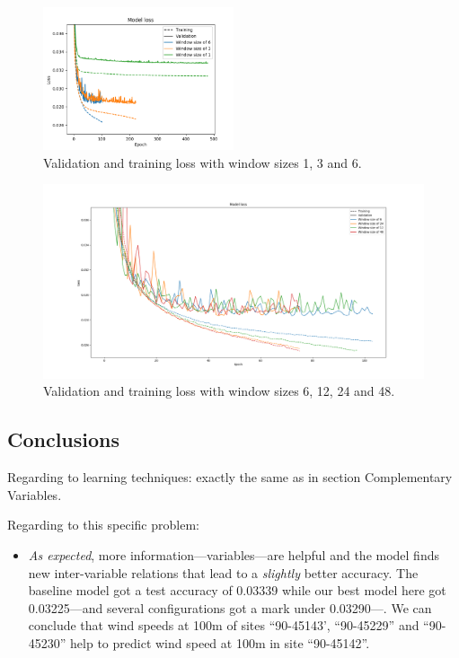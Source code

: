 \documentclass[]{article}
\begin{document}
	\begin{figure}[H]
		\centering
		\includegraphics[width=0.5\textwidth]{sites_4_1}
		\caption{Validation and training loss with window sizes 1, 3 and 6.}
		\label{f:sites_4_1}
	\end{figure}
	
	\begin{figure}[H]
		\centering
		\includegraphics[width=\textwidth]{sites_4_2}
		\caption{Validation and training loss with window sizes 6, 12, 24 and 48.}
		\label{f:sites_4_2}
	\end{figure}
	
	\subsection{Conclusions}
	
	Regarding to learning techniques: exactly the same as in section Complementary Variables.
	
	Regarding to this specific problem:
	
	\begin{itemize}
		\item \emph{As expected}, more information---variables---are helpful and the model finds new inter-variable relations that lead to a \emph{slightly} better accuracy. The baseline model got a test accuracy of 0.03339 while our best model here got 0.03225---and several configurations got a mark under 0.03290---. We can conclude that wind speeds at 100m of sites ``90-45143', ``90-45229'' and ``90-45230'' help to predict wind speed at 100m in site ``90-45142''.
	\end{itemize}
	
\end{document}

